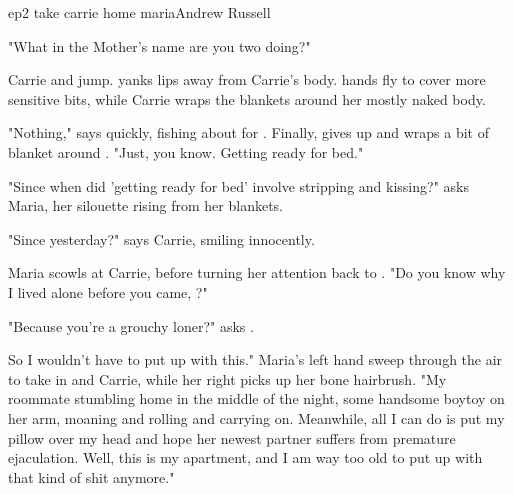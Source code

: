 \documentclass{book}
\begin{document}
\begin{childnode}{ep2 take carrie home maria}{Andrew Russell}

    "What in the Mother's name are you two doing?"
    
    Carrie and \name{} jump. \name{} yanks \hisher{} lips away from Carrie's body. \HisHer{} hands fly to cover \hisher{} more sensitive bits, while Carrie wraps the blankets around her mostly naked body. 

    "Nothing," says \name{} quickly, fishing about for \hisher{} . Finally, \heshe{} gives up and wraps a bit of blanket around \himselfherself{}. "Just, you know. Getting ready for bed."

    "Since when did 'getting ready for bed' involve stripping and kissing?" asks Maria, her silouette rising from her blankets.

    "Since yesterday?" says Carrie, smiling innocently.

    Maria scowls at Carrie, before turning her attention back to \name{}. "Do you know why I lived alone before you came, \name{}?"

    "Because you're a grouchy loner?" asks \name{}.
    
    So I wouldn't have to put up with this." Maria's left hand sweep through the air to take in \name{} and Carrie, while her right 
    picks up her bone hairbrush. "My roommate stumbling 
    home in the middle of the night, some handsome boytoy on her arm, moaning and rolling and carrying on. Meanwhile, all I can do is put my pillow over my head and hope her newest partner suffers from premature ejaculation. Well, this is my apartment, and I 
    am way too old to put up with that kind of shit anymore."
    


\end{childnode}
\end{document}
